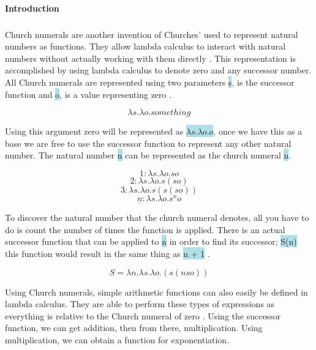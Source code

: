 \documentclass{article}
\begin{document}
\paragraph{Introduction}

\subparagraph{}

Church numerals are another invention of Churches' used to represent natural numbers as functions. They allow lambda calculus to interact with natural numbers without actually working with them directly \cite{CN}. This representation is accomplished by using lambda calculus to denote zero and any successor number. All Church numerals are represented using two parameters \colorbox{powderblue}{s}, is the successor function and \colorbox{powderblue}{o}, is a value representing zero \cite{CR}. \newline

\[\lambda s. \lambda o.  something\] \newline

Using this argument zero will be represented as \colorbox{powderblue}{$\lambda s. \lambda o. o$}, once we have this as a base we are free to use the successor function to represent any other natural number. The natural number \colorbox{powderblue}{n} can be represented as the church numeral \colorbox{powderblue}{n}. \newline

\[1: \lambda s. \lambda o. so\] 
\[2: \lambda s. \lambda o. s(so)\] 
\[3: \lambda s. \lambda o. s(s(so))\] 
\[\underline{n}: \lambda s. \lambda o. s^n o\] \newline

To discover the natural number that the church numeral denotes, all you have to do is count the number of times the function is applied. There is an actual successor function that can be applied to \colorbox{powderblue}{n} in order to find its successor; \colorbox{powderblue}{S(n)} this function would result in the same thing as \colorbox{powderblue}{n + 1} \cite{CR}. \newline

$$S = \lambda n. \lambda s. \lambda o. (s(nso))$$ \newline

Using Church numerals, simple arithmetic functions can also easily be defined in lambda calculus. They are able to perform these types of expressions as everything is relative to the Church numeral of zero \cite{CR}.  Using the successor function, we can get addition, then from there, multiplication. Using multiplication, we can obtain a function for exponentiation. 
\end{document}
